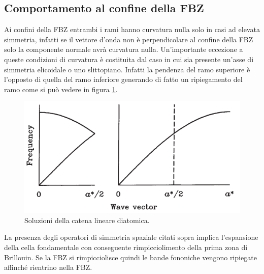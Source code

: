 \documentclass[oneside]{amsbook}
\numberwithin{section}{chapter}
\numberwithin{equation}{section}
\numberwithin{figure}{section}
\begin{document}
\subsection{Comportamento al confine della FBZ}
Ai confini della FBZ entrambi i rami hanno curvatura nulla solo in casi ad elevata simmetria, infatti se il vettore d'onda non è perpendicolare al confine della FBZ solo la componente normale avrà curvatura nulla.
Un'importante eccezione a queste condizioni di curvatura è costituita dal caso in cui sia presente un'asse di simmetria elicoidale o uno slittopiano. Infatti la pendenza del ramo superiore è l'opposto di quella del ramo inferiore generando di fatto un ripiegamento del ramo come si può vedere in figura \ref{AA3}.

\begin{figure}[H]
\centering
\caption{Soluzioni della catena lineare diatomica.}\label{AA3}
\includegraphics[scale=0.5]{AA3}
\end{figure}

La presenza degli operatori di simmetria spaziale citati sopra implica l'espansione della cella fondamentale con conseguente rimpicciolimento della prima zona di Brillouin. Se la FBZ si rimpicciolisce quindi le bande fononiche vengono ripiegate affinché rientrino nella FBZ.
\end{document}
